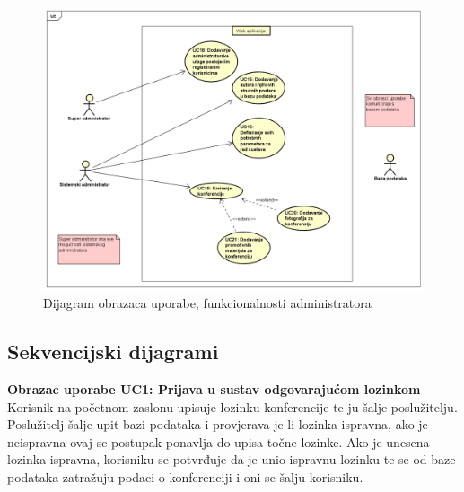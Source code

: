 					\begin{figure}[H]
						\includegraphics[width=\textwidth]{slike/adminUseCase.PNG} %
						\caption{Dijagram obrazaca uporabe, funkcionalnosti administratora}
						\label{fig:admin-dijagram} %
					\end{figure}
					
				\eject		
				
			\subsection{Sekvencijski dijagrami}
						
				\textbf{Obrazac uporabe UC1: Prijava u sustav odgovarajućom lozinkom}\\
				Korisnik na početnom zaslonu upisuje lozinku konferencije te ju šalje poslužitelju. Poslužitelj šalje upit bazi podataka i provjerava je li lozinka ispravna, ako je neispravna ovaj se postupak ponavlja do upisa točne lozinke. Ako je unesena lozinka ispravna, korisniku se potvrđuje da je unio ispravnu lozinku te se od baze podataka zatražuju podaci o konferenciji i oni se šalju korisniku.
				
